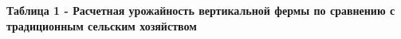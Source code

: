 {\bfseries Таблица 1 - Расчетная урожайность вертикальной фермы по
сравнению с традиционным сельским хозяйством}


